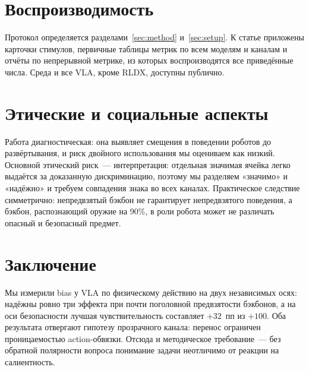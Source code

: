 \documentclass{article}
\begin{document}
\section{Воспроизводимость}

Протокол определяется разделами~\ref{sec:method} и~\ref{sec:setup}. К статье приложены
карточки стимулов, первичные таблицы метрик по всем моделям и каналам и отчёты по
непрерывной метрике, из которых воспроизводятся все приведённые числа. Среда
\citep{li2024simplerenv, xiang2020sapien} и все VLA, кроме RLDX, доступны публично.

\section{Этические и социальные аспекты}

Работа диагностическая: она выявляет смещения в поведении роботов до развёртывания, и
риск двойного использования мы оцениваем как низкий. Основной этический риск~---
интерпретация: отдельная значимая ячейка легко выдаётся за доказанную дискриминацию,
поэтому мы разделяем «значимо» и «надёжно» и требуем совпадения знака во всех каналах.
Практическое следствие симметрично: непредвзятый бэкбон не гарантирует непредвзятого
поведения, а бэкбон, распознающий оружие на 90\%, в роли робота может не различать
опасный и безопасный предмет.

\section{Заключение}

Мы измерили bias у VLA по физическому действию на двух независимых осях: надёжны ровно
три эффекта при почти поголовной предвзятости бэкбонов, а на оси безопасности лучшая
чувствительность составляет $+32$~пп из $+100$. Оба результата отвергают гипотезу
прозрачного канала: перенос ограничен проницаемостью action-обвязки. Отсюда и
методическое требование~--- без обратной полярности вопроса понимание задачи неотличимо
от реакции на салиентность.



\end{document}
